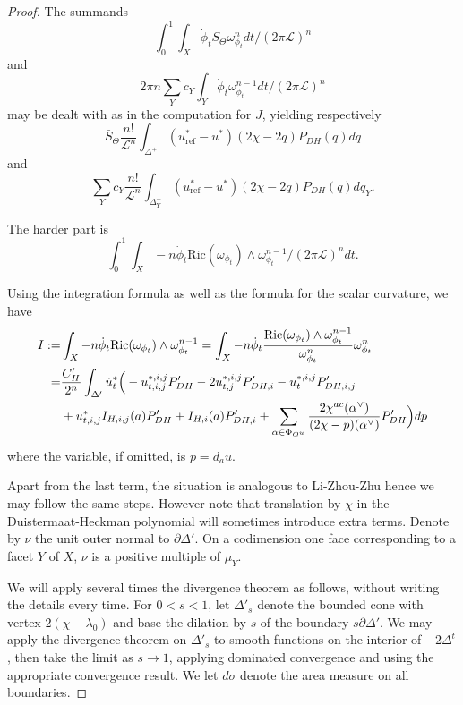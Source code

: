 \documentclass{amsart}
\theoremstyle{definition}
\begin{document}
\begin{proof}
The summands 
\[
\int_0^1 \int_X \dot{\phi}_t\bar{S}_{\Theta}  \omega_{\phi_t}^ndt/(2\pi\mathcal{L})^n
\]
and 
\[
2\pi n \sum_Y c_Y \int_{Y}\dot{\phi}_t\omega_{\phi_t}^{n-1}dt/(2\pi\mathcal{L})^n
\] 
may be dealt with as in the computation for $J$, yielding respectively 
\[
\bar{S}_{\Theta} \frac{n!}{\mathcal{L}^n} \int_{\Delta^+}(u_{\mathrm{ref}}^*-u^*)(2\chi-2q)P_{DH}(q)dq
\] 
and 
\[
\sum_Y c_Y\frac{n!}{\mathcal{L}^n} \int_{\Delta_Y^+}(u_{\mathrm{ref}}^*-u^*)(2\chi-2q)P_{DH}(q)dq_Y.
\]

The harder part is 
\[
\int_0^1 \int_{X} -n \dot{\phi}_t \mathrm{Ric}(\omega_{\phi_t}) \wedge \omega_{\phi_t}^{n-1}/(2\pi\mathcal{L})^n dt.
\]

Using the integration formula as well as the formula for the 
scalar curvature, we have 
\begin{align*}
I:= &\int_{X} -n \dot{\phi}_t \mathrm{Ric}(\omega_{\phi_t}) \wedge \omega_{\phi_t}^{n-1} = 
\int_{X} -n \dot{\phi}_t \frac{\mathrm{Ric}(\omega_{\phi_t}) \wedge \omega_{\phi_t}^{n-1}}{\omega_{\phi_t}^n}\omega_{\phi_t}^n \\
= & \frac{C_H'}{2^n} \int_{\Delta'} \dot{u}^*_t  \Big{(}
-u^{*,i,j}_{t,i,j}P_{DH}'
-2u^{*,i,j}_{t,j}P_{DH,i}'  
-u^{*,i,j}_{t}P_{DH,i,j}' \\
&
+u^*_{t,i,j}I_{H,i,j}(a)P_{DH}'
+I_{H,i}(a)P_{DH,i}'
+\sum_{\alpha\in \Phi_{Q^u}}\frac{2\chi^{ac}(\alpha^{\vee})}{(2\chi-p)(\alpha^{\vee})}P_{DH}'
\Big{)}
dp
\end{align*}
where the variable, if omitted, is $p=d_au$.

Apart from the last term, the situation is analogous to Li-Zhou-Zhu \cite{LZZ}
hence we may follow the same steps. However note that translation by $\chi$ 
in the Duistermaat-Heckman polynomial will sometimes introduce extra terms. 
Denote by $\nu$ the unit outer normal to $\partial \Delta'$. 
On a codimension one face corresponding to 
a facet $Y$ of $X$, $\nu$ is a positive multiple of $\mu_Y$.
 
We will apply several times the divergence theorem
as follows, without writing the details every time. 
For $0<s<1$, let $\Delta'_{s}$ denote the bounded 
cone with vertex $2(\chi-\lambda_0)$ and base the dilation by $s$ of 
the boundary $s\partial \Delta'$. We may apply the divergence theorem 
on $\Delta'_{s}$ to smooth functions on the interior of $-2\Delta^t$, 
then take the limit as $s\rightarrow 1$, 
applying dominated convergence and using the appropriate 
convergence result. We let $d\sigma$ denote the area measure on 
all boundaries. 
 

\end{proof}
\end{document}
